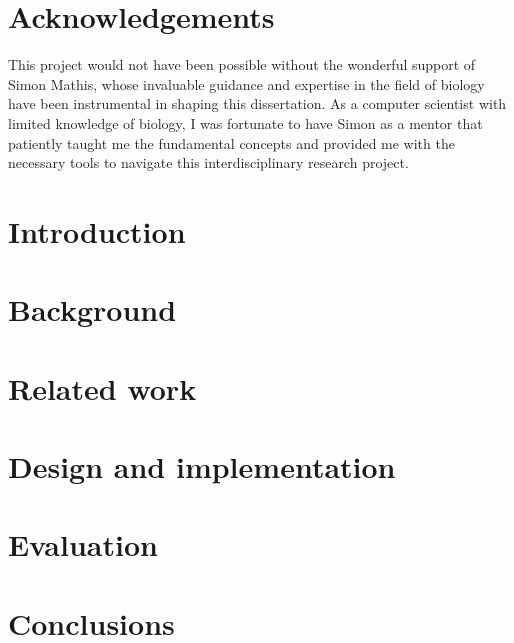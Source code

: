 \documentclass[12pt,a4paper]{report}
\begin{document}
\chapter*{Acknowledgements}

This project would not have been possible without the wonderful
support of Simon Mathis, whose invaluable guidance and expertise in the field of biology have been instrumental in shaping this dissertation. As a computer scientist with limited knowledge of biology, I was fortunate to have Simon as a mentor that patiently taught me the fundamental concepts and provided me with the necessary tools to navigate this interdisciplinary research project. 

\fi
\cleardoublepage %

\tableofcontents
\listoffigures
\listoftables
\chapter{Introduction}

\label{firstcontentpage} %

\chapter{Background}



\chapter{Related work}



\chapter{Design and implementation}



\chapter{Evaluation}
\label{results}



\chapter{Conclusions}
\end{document}
